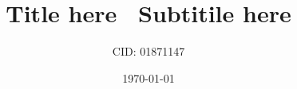 \documentclass[11pt]{article}
\begin{document}
\title{Title here \ Subtitile here}
\date{\today}
\author{CID: 01871147}
\maketitle
\end{document}

